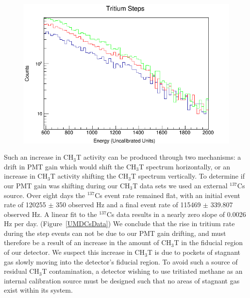 \begin{figure}
\includegraphics[scale=.35]{Steps_Overlay.png} 
\label{UMDOutgassingSpectra}
\end{figure}

Such an increase in CH$_3$T activity can be produced through two mechanisms: a drift in PMT gain which would shift the CH$_3$T spectrum horizontally, or an increase in CH$_3$T activity shifting the CH$_3$T spectrum vertically. To determine if our PMT gain was shifting during our CH$_3$T data sets we used an external $^{137}$Cs source. Over eight days the $^{137}$Cs event rate remained flat, with an initial event rate of 120255 $\pm$ 350 observed Hz and a final event rate of 115469 $\pm$ 339.807 observed Hz. A linear fit to the $^{137}$Cs data results in a nearly zero slope of 0.0026 Hz per day. (Figure~\ref{UMDCsData}) We conclude that the rise in tritium rate during the step events can not be due to our PMT gain drifting, and must therefore be a result of an increase in the amount of CH$_3$T in the fiducial region of our detector. We suspect this increase in CH$_3$T is due to pockets of stagnant gas slowly moving into the detector's fiducial region. To avoid such a source of residual CH$_3$T contamination, a detector wishing to use tritiated methane as an internal calibration source must be designed such that no areas of stagnant gas exist within its system.  

